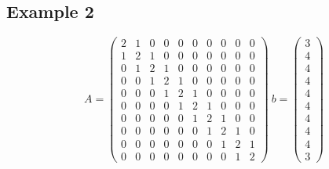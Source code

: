 \documentclass[12pt]{article}
\begin{document}
\subsection{Example 2}
$$A = \left(\begin{array}{cccccccccc} 2 & 1 & 0 & 0 & 0 & 0 & 0 & 0 & 0 & 0\\ 1 & 2 & 1 & 0 & 0 & 0 & 0 & 0 & 0 & 0\\ 0 & 1 & 2 & 1 & 0 & 0 & 0 & 0 & 0 & 0\\ 0 & 0 & 1 & 2 & 1 & 0 & 0 & 0 & 0 & 0\\ 0 & 0 & 0 & 1 & 2 & 1 & 0 & 0 & 0 & 0\\ 0 & 0 & 0 & 0 & 1 & 2 & 1 & 0 & 0 & 0\\ 0 & 0 & 0 & 0 & 0 & 1 & 2 & 1 & 0 & 0\\ 0 & 0 & 0 & 0 & 0 & 0 & 1 & 2 & 1 & 0\\ 0 & 0 & 0 & 0 & 0 & 0 & 0 & 1 & 2 & 1\\ 0 & 0 & 0 & 0 & 0 & 0 & 0 & 0 & 1 & 2 \end{array}\right)\ 
b = \left(\begin{array}{c} 3\\ 4\\ 4\\ 4\\ 4\\ 4\\ 4\\ 4\\ 4\\ 3 \end{array}\right)$$
\end{document}
